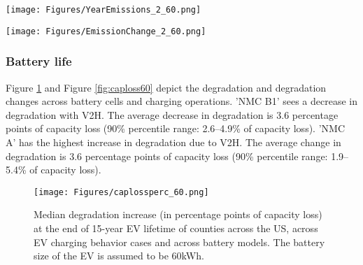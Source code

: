 \documentclass[11pt,preprint]{elsarticle}
\begin{document}
\begin{figure*}[H]
    \centering
    \texttt{[image: Figures/YearEmissions\_2\_60.png]}
    \caption{Median lifetime charging GHG emissions for individual EVs, of each region across the US. Charging GHG emissions are defined as the net increase in GHG emissions of the whole home after introducing EV charging. The EV battery capacity is 60kWh.}
    \label{fig:yearemission60}
\end{figure*}

\begin{figure*}[H]
    \centering
    \texttt{[image: Figures/EmissionChange\_2\_60.png]}
    \caption{Median changes in lifetime charging emissions, when EV owners switch from uncontrolled charging or controlled charging to V2H, from uncontrolled charging to controlled charging, or from an ICEV to an EV with uncontrolled charging, of each region across the US. Charging emissions are defined as the net increase in total GHG emissions of the whole home with EV charging. Results for EVs with charging modes of uncontrolled charging, controlled charging, V2H for homes with electrified heating, and ICEVs. The EV battery capacity is 60kWh.}
    \label{fig:emissionchange60}
\end{figure*}



\subsubsection{Battery life}


Figure \ref{fig:caploss60perc} and Figure \ref{fig:caploss60} depict the degradation and degradation changes across battery cells and charging operations. 'NMC B1' sees a decrease in degradation with V2H. The average decrease in degradation is 3.6 percentage points of capacity loss (90\% percentile range: 2.6--4.9\% of capacity loss). 'NMC A' has the highest increase in degradation due to V2H. The average change in degradation is 3.6 percentage points of capacity loss (90\% percentile range: 1.9--5.4\% of capacity loss).

\begin{figure}[H]
    \centering
    \texttt{[image: Figures/caplossperc\_60.png]}
    \caption{Median degradation increase (in percentage points of capacity loss) at the end of 15-year EV lifetime of counties across the US, across EV charging behavior cases and across battery models. The battery size of the EV is assumed to be 60kWh.}
    \label{fig:caploss60perc}
\end{figure}
\end{document}
